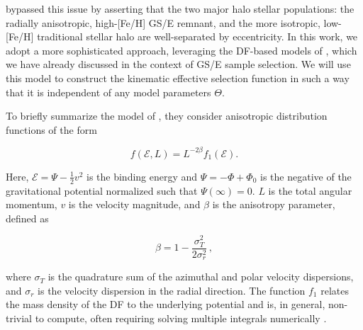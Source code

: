 \cite{mackereth20} bypassed this issue by asserting that the two major halo stellar populations: the radially anisotropic, high-[Fe/H] GS/E remnant, and the more isotropic, low-[Fe/H] traditional stellar halo are well-separated by eccentricity. In this work, we adopt a more sophisticated approach, leveraging the DF-based models of \cite{lane22}, which we have already discussed in the context of GS/E sample selection. We will use this model to construct the kinematic effective selection function in such a way that it is independent of any model parameters $\Theta$.

To briefly summarize the model of \cite{lane22}, they consider anisotropic distribution functions of the form \parencite[see, e.g.][]{binney08}

\begin{equation}
    \label{ch3:eq:anisotropic-df}
    f(\mathcal{E},L) = L^{-2\beta}f_{1}(\mathcal{E}).
\end{equation}

Here, $\mathcal{E} = \Psi - \frac{1}{2}v^{2}$ is the binding energy and $\Psi = -\Phi + \Phi_{0}$ is the negative of the gravitational potential normalized such that $\Psi(\infty) = 0$. $L$ is the total angular momentum, $v$ is the velocity magnitude, and $\beta$ is the anisotropy parameter, defined as

\begin{equation}
    \label{ch3:eq:beta}
    \beta = 1- \frac{\sigma_{T}^{2}}{2\sigma^{2}_{r}}\,,
\end{equation}

\noindent where $\sigma_{T}$ is the quadrature sum of the azimuthal and polar velocity dispersions, and $\sigma_{r}$ is the velocity dispersion in the radial direction. The function $f_{1}$ relates the mass density of the DF to the underlying potential and is, in general, non-trivial to compute, often requiring solving multiple integrals numerically \parencite[For more information see ][ particularly Appendix A]{lane22}.

